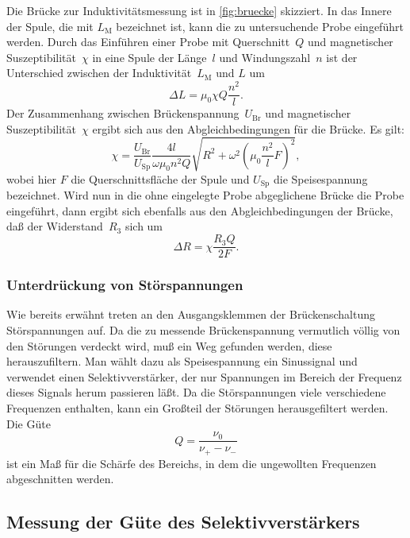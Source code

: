 Die Brücke zur Induktivitätsmessung ist in \cref{fig:bruecke}
skizziert.  In das Innere der Spule, die mit $L_\text{M}$ bezeichnet ist,
kann die zu untersuchende Probe eingeführt werden.  Durch das Einführen
einer Probe mit Querschnitt~$Q$ und magnetischer Suszeptibilität~$\chi$
in eine Spule der Länge~$l$ und Windungszahl~$n$ ist der Unterschied
zwischen der Induktivität~$L_\text{M}$ und $L$ um
\begin{equation}
  \Delta L = \mu_0 \chi Q \frac{n^2}{l}.
\end{equation}
Der Zusammenhang zwischen Brückenspannung~$U_\text{Br}$ und magnetischer
Suszeptibilität~$\chi$ ergibt sich aus den Abgleichbedingungen für die
Brücke.  Es gilt:
\begin{equation}
  \label{eq:chi-spannungen}
  \chi = \frac{U_\text{Br}}{U_\text{Sp}} \frac{4 l}{\omega \mu_0 n^2 Q}
  \sqrt{R^2 + \omega^2 \left(\mu_0 \frac{n^2}{l} F\right)^2},
\end{equation}
wobei hier $F$ die Querschnittsfläche der Spule und $U_\text{Sp}$ die
Speisespannung bezeichnet.  Wird nun in die ohne eingelegte Probe
abgeglichene Brücke die Probe eingeführt, dann ergibt sich ebenfalls aus
den Abgleichbedingungen der Brücke, daß der Widerstand~$R_3$ sich um
\begin{equation}
  \label{eq:delta-r}
  \Delta R = \chi \frac{R_3 Q}{2 F}.
\end{equation}

\subsubsection{Unterdrückung von Störspannungen}

Wie bereits erwähnt treten an den Ausgangsklemmen der Brückenschaltung
Störspannungen auf.  Da die zu messende Brückenspannung vermutlich
völlig von den Störungen verdeckt wird, muß ein Weg gefunden werden,
diese herauszufiltern.  Man wählt dazu als Speisespannung ein
Sinussignal und verwendet einen Selektivverstärker, der nur Spannungen
im Bereich der Frequenz dieses Signals herum passieren läßt.  Da die
Störspannungen viele verschiedene Frequenzen enthalten, kann ein
Großteil der Störungen herausgefiltert werden.  Die Güte
\begin{equation}
  \label{eq:guete}
  Q = \frac{\nu_0}{\nu_+ - \nu_-}
\end{equation}
ist ein Maß für die Schärfe des Bereichs, in dem die ungewollten
Frequenzen abgeschnitten werden.

\subsection{Messung der Güte des Selektivverstärkers}

